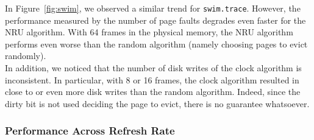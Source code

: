 \documentclass[letterpaper]{article}
\begin{document}
In Figure~\ref{fig:swim}, we observed a similar trend for \texttt{swim.trace}. However, the performance measured by the number of page faults degrades even faster for the NRU algorithm. With 64 frames in the physical memory, the NRU algorithm performs even worse than the random algorithm (namely choosing pages to evict randomly).\\
In addition, we noticed that the number of disk writes of the clock algorithm is inconsistent. In particular, with 8 or 16 frames, the clock algorithm resulted in close to or even more disk writes than the random algorithm. Indeed, since the dirty bit is not used deciding the page to evict, there is no guarantee whatsoever.
\subsubsection{Performance Across Refresh Rate}\label{sec:refresh}
\end{document}
